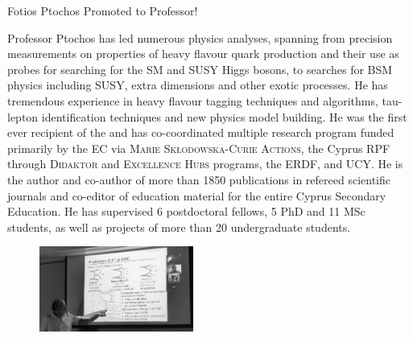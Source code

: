 \begin{headline}[enhanced, tikz={rotate=0}, width=0.48\textwidth]{Fotios Ptochos Promoted to Professor!}
\begin{multicols}{2}
    Professor Ptochos has led numerous physics analyses, spanning
    from precision measurements on properties of heavy flavour quark
    production and their use as probes for searching for the SM and SUSY
    Higgs bosons, to searches for BSM physics including SUSY, extra
    dimensions and other exotic processes. He has tremendous experience in
    heavy flavour tagging techniques and algorithms, tau-lepton
    identification techniques and new physics model building. 
    He was the first ever recipient of the  and has co-coordinated multiple research program
    funded primarily by the EC via \textsc{Marie
      Skłodowska-Curie Actions}, the Cyprus RPF through
    \textsc{Didaktor} and \textsc{Excellence Hubs} programs, the ERDF,
    and UCY. He is the author and co-author of more than 
    1850 publications in refereed scientific journals and co-editor of
    education material for the entire Cyprus Secondary Education. He has
    supervised 6 postdoctoral fellows, 5
    PhD and 11 MSc students, as well as projects of more than 20
    undergraduate students.  
    \begin{figure}
      \begin{center}
        \leavevmode
        \includegraphics[width=0.45\textwidth]{./figures/Fotis7.png}
      \end{center}
    \end{figure}
  \end{multicols}
\end{headline}

